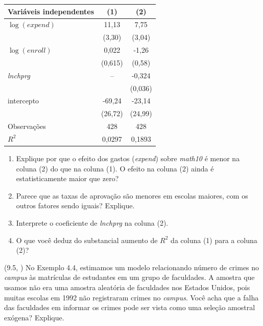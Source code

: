 \documentclass[12pt,letterpaper, onecolumn]{exam}
\begin{document}
\begin{questions}
\begin{center}
\begin{tabular}{lcc}
\toprule
Variáveis independentes & (1) & (2) \\
\midrule
\(\log(expend)\) & 11,13 & 7,75 \\
& (3,30) & (3,04) \\
\(\log(enroll)\) & 0,022 & -1,26 \\
& (0,615) & (0,58) \\
\textit{lnchprg} & -- & -0,324 \\
& & (0,036) \\
intercepto & -69,24 & -23,14 \\
& (26,72) & (24,99) \\
Observações & 428 & 428 \\
\(R^2\) & 0,0297 & 0,1893 \\
\bottomrule
\end{tabular}
\end{center}

\begin{enumerate}[label=(\roman*),resume]
    \item Explique por que o efeito dos gastos (\textit{expend}) sobre \textit{math10} é menor na coluna (2) do que na coluna (1). O efeito na coluna (2) ainda é estatisticamente maior que zero?
    \item Parece que as taxas de aprovação são menores em escolas maiores, com os outros fatores sendo iguais? Explique.
    \item Interprete o coeficiente de \textit{lnchprg} na coluna (2).
    \item O que você deduz do substancial aumento de \(R^2\) da coluna (1) para a coluna (2)?
\end{enumerate}

\vspace{0.7cm}

\question (9.5, \citep{wooldridge2016}) No Exemplo 4.4, estimamos um modelo relacionando número de crimes no \textit{campus} às matrículas de estudantes em um grupo de faculdades. A amostra que usamos não era uma amostra aleatória de faculdades nos Estados Unidos, pois muitas escolas em 1992 não registraram crimes no \textit{campus}. Você acha que a falha das faculdades em informar os crimes pode ser vista como uma seleção amostral exógena? Explique.

\vspace{0.7cm}


\end{questions}
\end{document}
